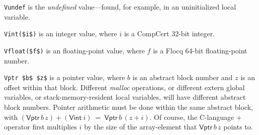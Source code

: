 \documentclass[12pt,fleqn,openany,oneside,showtrims]{memoir}
\begin{document}
\lstinline{Vundef} is the \emph{undefined} value---found, for example,
in an uninitialized local variable.

\lstinline{Vint($i$)} is an integer value,
where $i$ is a CompCert 32-bit integer.

\lstinline{Vfloat($f$)} is an floating-point value,
where $f$ is a Flocq 64-bit floating-point number.

\lstinline{Vptr $b$ $z$} is a pointer value,
where $b$ is an abstract block number and $z$ is an offset
within that block.  Different \emph{malloc} operations,
or different extern global variables, or
stack-memory-resident local variables,
will have different abstract block numbers.
Pointer arithmetic must be done within the same abstract block,
with $(\mathsf{Vptr}\,b\,z)+(\mathsf{Vint}~i)~=~\mathsf{Vptr}\,b\,(z+i)$.
Of course, the C-language + operator first multiplies $i$
by the size of the array-element that
$\mathsf{Vptr}\,b\,z$ points to.
\end{document}
